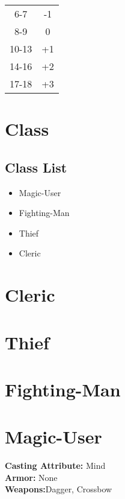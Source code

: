 \documentclass[18pt]{article}
\begin{document}
\begin{multicols}{2}
\begin{table}[H]
\begin{center}
\begin{tabular}{ c  c  }
6-7 & -1 \\

8-9 & 0 \\

10-13 & +1 \\

14-16 & +2 \\

17-18 & +3 \\

\end{tabular}
\end{center}
\label{table:RollingAttributes}
\end{table}

\section*{Class}
\subsection*{Class List}
\begin{itemize}
	\item Magic-User
	\item Fighting-Man
	\item Thief
	\item Cleric
\end{itemize}
\section*{Cleric}
\section*{Thief}
\section*{Fighting-Man}
\section*{Magic-User}
\begin{mercClassInfo}
\textbf{Casting Attribute:} Mind\\
\textbf{Armor:} None\\
\textbf{Weapons:}Dagger, Crossbow
\end{mercClassInfo}
\end{multicols}
\end{document}
